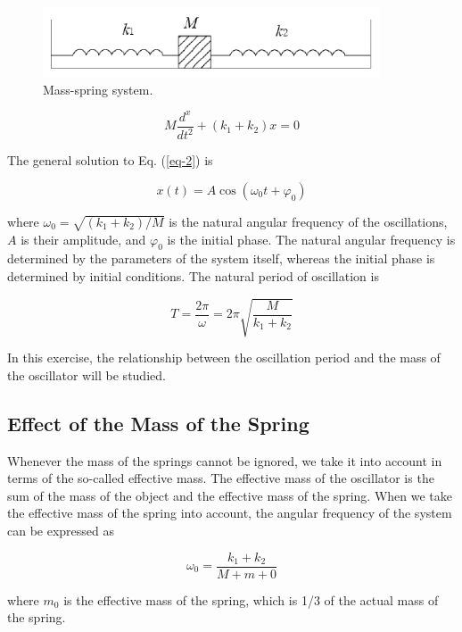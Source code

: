 \documentclass{article}
\begin{document}
\begin{figure}[!h]
	\centering
	\includegraphics[width=10cm]{fig-1.png}
	\caption{Mass-spring system.
	\label{fig-1}}
\end{figure}

\begin{equation}\label{eq-2}
M\frac{d^x}{dt^2}+(k_1+k_2)x=0
\end{equation}

The general solution to Eq. (\ref{eq-2}) is

\begin{equation}\label{eq-3}
x(t)=A\cos(\omega_0t+\varphi_0)
\end{equation}

where $\omega_0=\sqrt{(k_1+k_2)/M}$ is the natural angular frequency of the oscillations, $A$ is their
amplitude, and $\varphi_0$ is the initial phase. The natural angular frequency is determined by
the parameters of the system itself, whereas the initial phase is determined by initial
conditions. The natural period of oscillation is

\begin{equation}\label{eq-4}
T=\frac{2\pi}{\omega}=2\pi\sqrt{\frac{M}{k_1+k_2}}
\end{equation}

In this exercise, the relationship between the oscillation period and the mass of the oscillator will be studied.

\subsection{Effect of the Mass of the Spring}

Whenever the mass of the springs cannot be ignored, we take it into account in terms
of the so-called effective mass. The effective mass of the oscillator is the sum of the mass
of the object and the effective mass of the spring. When we take the effective mass of the
spring into account, the angular frequency of the system can be expressed as

\begin{equation}\label{eq-5}
\omega_0=\frac{k_1+k_2}{M+m+0}
\end{equation}

where $m_0$ is the effective mass of the spring, which is 1/3 of the actual mass of the spring.
\end{document}
